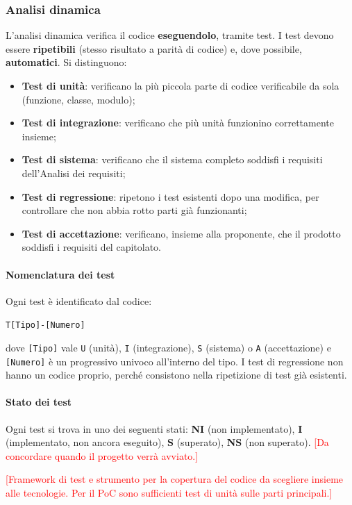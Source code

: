 \documentclass[12pt,a4paper]{article}
\newcommand{\ph}[1]{\textcolor{red}{[#1]}}
\newcommand{\tightlist}{\setlength{\itemsep}{1pt}\setlength{\parskip}{0pt}}
\begin{document}
\subsubsection{Analisi dinamica}
L'analisi dinamica verifica il codice \textbf{eseguendolo}, tramite test. I test devono essere \textbf{ripetibili} (stesso risultato a parità di codice) e, dove possibile, \textbf{automatici}. Si distinguono:
\begin{itemize}
\tightlist
\item \textbf{Test di unità}: verificano la più piccola parte di codice verificabile da sola (funzione, classe, modulo);
\item \textbf{Test di integrazione}: verificano che più unità funzionino correttamente insieme;
\item \textbf{Test di sistema}: verificano che il sistema completo soddisfi i requisiti dell'Analisi dei requisiti;
\item \textbf{Test di regressione}: ripetono i test esistenti dopo una modifica, per controllare che non abbia rotto parti già funzionanti;
\item \textbf{Test di accettazione}: verificano, insieme alla proponente, che il prodotto soddisfi i requisiti del capitolato.
\end{itemize}

\paragraph{Nomenclatura dei test}
Ogni test è identificato dal codice:
\begin{center}\texttt{T[Tipo]-[Numero]}\end{center}
dove \texttt{[Tipo]} vale \texttt{U} (unità), \texttt{I} (integrazione), \texttt{S} (sistema) o \texttt{A} (accettazione) e \texttt{[Numero]} è un progressivo univoco all'interno del tipo. I test di regressione non hanno un codice proprio, perché consistono nella ripetizione di test già esistenti.

\paragraph{Stato dei test}
Ogni test si trova in uno dei seguenti stati: \textbf{NI} (non implementato), \textbf{I} (implementato, non ancora eseguito), \textbf{S} (superato), \textbf{NS} (non superato). \ph{Da concordare quando il progetto verrà avviato.}

\ph{Framework di test e strumento per la copertura del codice da scegliere insieme alle tecnologie. Per il PoC sono sufficienti test di unità sulle parti principali.}
\end{document}
